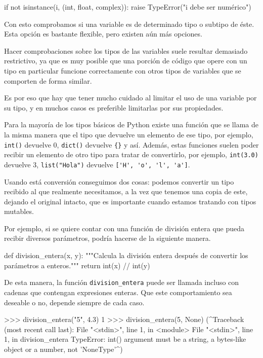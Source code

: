 \begin{codigo-python-sn}
if not isinstance(i, (int, float, complex)):
    raise TypeError("i debe ser numérico")
\end{codigo-python-sn}

Con esto comprobamos si una variable es de determinado tipo o subtipo de
éste. Esta opción es bastante flexible, pero existen aún más opciones.

\begin{atencion}
Hacer comprobaciones sobre los tipos de las variables suele resultar
demasiado restrictivo, ya que es muy posible que una porción de código que
opere con un tipo en particular funcione correctamente con otros tipos de
variables que se comporten de forma similar.

Es por eso que hay que tener mucho cuidado al limitar el uso de una
variable por su tipo, y en muchos casos es preferible limitarlas por sus
propiedades.
\end{atencion}

Para la mayoría de los tipos básicos de Python existe una función que se
llama de la misma manera que el tipo que devuelve un elemento de ese tipo,
por ejemplo, \lstinline!int()! devuelve 0, \lstinline!dict()! devuelve
\lstinline!{}! y así. Además, estas funciones suelen poder recibir un
elemento de otro tipo para tratar de convertirlo, por ejemplo,
\lstinline!int(3.0)! devuelve 3, \lstinline!list("Hola")! devuelve
\lstinline!['H', 'o', 'l', 'a']!.

Usando está conversión conseguimos dos cosas: podemos convertir un tipo
recibido al que realmente necesitamos, a la vez que tenemos una copia de
este, dejando el original intacto, que es importante cuando estamos
tratando con tipos mutables.

Por ejemplo, si se quiere contar con una función de división entera que
pueda recibir diversos parámetros, podría hacerse de la siguiente manera.

\begin{codigo-python-sn}
def division_entera(x, y):
    """Calcula la división entera después de convertir los parámetros a
    enteros."""
    return int(x) // int(y)
\end{codigo-python-sn}

De esta manera, la función \lstinline!division_entera! puede ser llamada
incluso con cadenas que contengan expresiones enteras. Que este
comportamiento sea deseable o no, depende siempre de cada caso.

\begin{codigo-python-sn}
>>> division_entera("5", 4.3)
1
>>> division_entera(5, None)
(^Traceback (most recent call last):
  File "<stdin>", line 1, in <module>
  File "<stdin>", line 1, in division_entera
TypeError: int() argument must be a string, a bytes-like object or a number,
not 'NoneType'^)
\end{codigo-python-sn}

